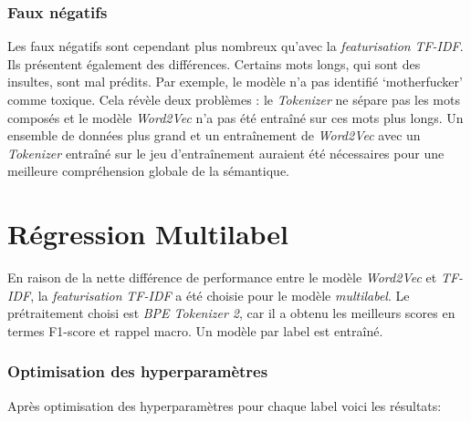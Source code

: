 \subsubsection{Faux négatifs}
Les faux négatifs sont cependant plus nombreux qu'avec la \textit{featurisation} \textit{TF-IDF}. 
Ils présentent également des différences. Certains mots longs, qui sont des insultes, sont mal prédits. 
Par exemple, le modèle n'a pas identifié `motherfucker' comme toxique. 
Cela révèle deux problèmes : le \textit{Tokenizer} ne sépare pas les mots composés et le modèle \textit{Word2Vec} n'a pas été entraîné sur ces mots plus longs. 
Un ensemble de données plus grand et un entraînement de \textit{Word2Vec} avec un \textit{Tokenizer} entraîné sur le jeu d'entraînement auraient été nécessaires pour une meilleure compréhension globale de la sémantique.

\newpage
\section{Régression Multilabel}
En raison de la nette différence de performance entre le modèle \textit{Word2Vec} et \textit{TF-IDF}, la \textit{featurisation} \textit{TF-IDF} a été choisie pour le modèle \textit{multilabel}. 
Le prétraitement choisi est \textit{BPE Tokenizer 2}, car il a obtenu les meilleurs scores en termes F1-score et rappel macro. 
Un modèle par label est entraîné.
\subsubsection{Optimisation des hyperparamètres}
Après optimisation des hyperparamètres pour chaque label voici les résultats:


